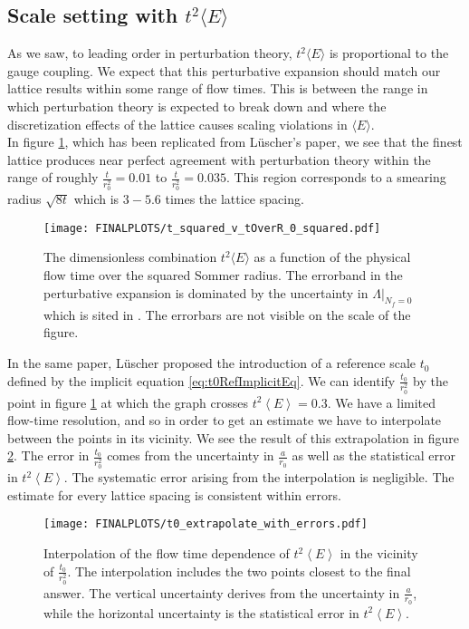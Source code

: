 \documentclass[a4paper,10pt]{book}
\begin{document}
\subsection{Scale setting with $t^2\langle E\rangle$}
As we saw, to leading order in perturbation theory, $t^2\langle E\rangle$ is proportional to the gauge coupling. We expect that this perturbative expansion should match our lattice results within some range of flow times. This is between the range in which perturbation theory is expected to break down and where the discretization effects of the lattice causes scaling violations in $\langle E\rangle$.\\In figure \ref{fig:tsquaredE_v_flowtime}, which has been replicated from Lüscher's paper\cite{Luscher2010}, we see that the finest lattice produces near perfect agreement with perturbation theory within the range of roughly $\frac{t}{r_0^2}=0.01$ to $\frac{t}{r_0^2}=0.035$. This region corresponds to a smearing radius $\sqrt{8t}$ which is $3-5.6$ times the lattice spacing.
\begin{figure}[htbp]
\centering
\texttt{[image: FINALPLOTS/t\_squared\_v\_tOverR\_0\_squared.pdf]}
\caption[]{The dimensionless combination $t^2\langle E\rangle$ as a function of the physical flow time over the squared Sommer radius. The errorband in the perturbative expansion is dominated by the uncertainty in $\Lambda\big|_{N_f=0}$ which is sited in \cite{CapitaniStefano1999Nqmr}. The errorbars are not visible on the scale of the figure.}\label{fig:tsquaredE_v_flowtime}
\end{figure}
In the same paper, Lüscher proposed the introduction of a reference scale $t_0$ defined by the implicit equation \eqref{eq:t0RefImplicitEq}. We can identify $\frac{t_0}{r_0^2}$ by the point in figure \ref{fig:tsquaredE_v_flowtime} at which the graph crosses $t^2\left\langle E\right\rangle = 0.3$. We have a limited flow-time resolution, and so in order to get an estimate we have to interpolate between the points in its vicinity. We see the result of this extrapolation in figure \ref{fig:t0-extrapolation}. The error in $\frac{t_0}{r_0^2}$ comes from the uncertainty in $\frac{a}{r_0}$ as well as the statistical error in $t^2\left\langle E\right\rangle$. The systematic error arising from the interpolation is negligible. The estimate for every lattice spacing is consistent within errors.
\begin{figure}[htbp]
\centering
\texttt{[image: FINALPLOTS/t0\_extrapolate\_with\_errors.pdf]}
\caption[]{Interpolation of the flow time dependence of $t^2\left\langle E\right\rangle $ in the vicinity of $\frac{t_0}{r_0^2}$. The interpolation includes the two points closest to the final answer. The vertical uncertainty derives from the uncertainty in $\frac{a}{r_0}$, while the horizontal uncertainty is the statistical error in $t^2\left\langle E\right\rangle $.}\label{fig:t0-extrapolation}
\end{figure}
\end{document}
